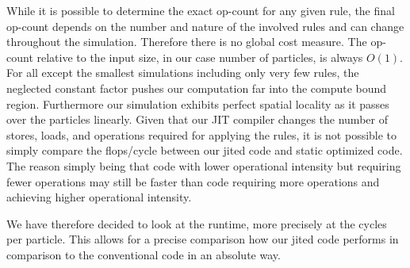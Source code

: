While it is possible to determine the exact op-count for any given rule, the final op-count depends on the number and nature of the involved rules and can change throughout the simulation.
Therefore there is no global cost measure.
The op-count relative to the input size, in our case number of particles, is always $O(1)$.
For all except the smallest simulations including only very few rules, the neglected constant factor pushes our computation far into the compute bound region.
Furthermore our simulation exhibits perfect spatial locality as it passes over the particles linearly.
Given that our JIT compiler changes the number of stores, loads, and operations required for applying the rules, it is not possible to simply compare the flops/cycle between our jited code and static optimized code.
The reason simply being that code with lower operational intensity but requiring fewer operations may still be faster than code requiring more operations and achieving higher operational intensity.

We have therefore decided to look at the runtime, more precisely at the cycles per particle. This allows for a precise comparison how our jited code performs in comparison to the conventional code in an absolute way.
